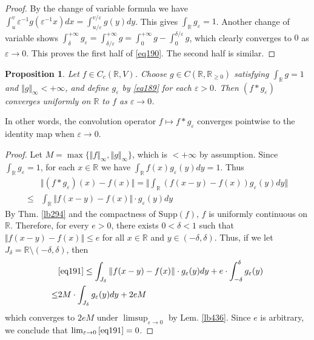 \documentclass[12pt,b5paper,notitlepage]{article}
\theoremstyle{definition}
\theoremstyle{plain}
\newtheorem{pp}[df]{Proposition}
\newcommand{\Rbb}{\mathbb R}
\newcommand{\Supp}{\mathrm{Supp}}
\newcommand{\eps}{\varepsilon}
\numberwithin{equation}{section}
\begin{document}
\begin{proof}
By the change of variable formula we have $\int_u^v \eps^{-1}g(\eps^{-1}x)dx=\int_{u/\eps}^{v/\eps}g(y)dy$. This gives $\int_\Rbb g_\eps=1$. Another change of variable shows $\int_\delta^{+\infty}g_\eps=\int_{\delta/\eps}^{+\infty}g=\int_0^{+\infty}g-\int_0^{\delta/\eps}g$, which clearly converges to $0$ as $\eps\rightarrow0$. This proves the first half of \eqref{eq190}. The second half is similar.
\end{proof}




\begin{pp}\label{lb437}
Let $f\in C_c(\Rbb,V)$. Choose $g\in C(\Rbb,\Rbb_{\geq0})$ satisfying $\int_\Rbb g=1$ and $\Vert g\Vert_\infty<+\infty$, and define $g_\eps$ by \eqref{eq189} for each $\eps>0$. Then $(f*g_\eps)$ converges uniformly on $\Rbb$ to $f$ as $\eps\rightarrow0$.
\end{pp}

In other words, the convolution operator $f\mapsto f*g_\eps$ converges pointwise to the identity map when $\eps\rightarrow 0$.

\begin{proof}
Let $M=\max\{\Vert f\Vert_\infty,\Vert g\Vert_\infty\}$, which is $<+\infty$ by assumption. Since $\int_\Rbb g_\eps=1$, for each $x\in\Rbb$ we have $\int_\Rbb f(x)g_\eps(y)dy=1$. Thus
\begin{align}
&\Vert (f*g_\eps)(x)-f(x)\Vert=\Big\Vert \int_\Rbb(f(x-y)-f(x))g_\eps(y)dy \Big\Vert\nonumber\\
\leq &\int_\Rbb  \Vert f(x-y)-f(x)\Vert \cdot g_\eps(y)dy \label{eq191}
\end{align}
By Thm. \ref{lb294} and the compactness of $\Supp(f)$, $f$ is uniformly continuous on $\Rbb$. Therefore, for every $e>0$, there exists $0<\delta<1$ such that $\Vert f(x-y)-f(x)\Vert\leq e$ for all $x\in\Rbb$ and $y\in(-\delta,\delta)$. Thus, if we let $J_\delta=\Rbb\setminus(-\delta,\delta)$, then
\begin{align*}
&\eqref{eq191}\leq \int_{J_\delta}\Vert f(x-y)-f(x)\Vert \cdot g_\eps(y)dy+e\cdot \int_{-\delta}^\delta g_\eps(y)\\
\leq& 2M\cdot \int_{J_\delta} g_\eps(y)dy+2eM 
\end{align*}
which converges to $2eM$ under $\limsup_{\eps\rightarrow0}$ by Lem. \ref{lb436}. Since $e$ is arbitrary, we conclude that $\lim_{\eps\rightarrow0}\eqref{eq191}=0$.
\end{proof}
\end{document}
